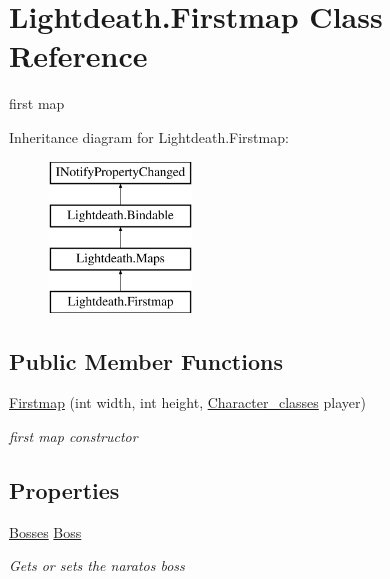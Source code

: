 \hypertarget{class_lightdeath_1_1_firstmap}{}\section{Lightdeath.\+Firstmap Class Reference}
\label{class_lightdeath_1_1_firstmap}


first map  


Inheritance diagram for Lightdeath.\+Firstmap\+:\begin{figure}[H]
\begin{center}
\leavevmode
\includegraphics[height=4.000000cm]{class_lightdeath_1_1_firstmap}
\end{center}
\end{figure}
\subsection*{Public Member Functions}
\begin{DoxyCompactItemize}
\item 
\hyperlink{class_lightdeath_1_1_firstmap_afc01fcdaaf97855d79022f790f29c439}{Firstmap} (int width, int height, \hyperlink{class_lightdeath_1_1_character__classes}{Character\+\_\+classes} player)
\begin{DoxyCompactList}\small\item\em first map constructor \end{DoxyCompactList}\end{DoxyCompactItemize}
\subsection*{Properties}
\begin{DoxyCompactItemize}
\item 
\hyperlink{class_lightdeath_1_1_bosses}{Bosses} \hyperlink{class_lightdeath_1_1_firstmap_ae75fa99010fb35bf62e02c7f91f9ee43}{Boss}
\begin{DoxyCompactList}\small\item\em Gets or sets the naratos boss \end{DoxyCompactList}\end{DoxyCompactItemize}
